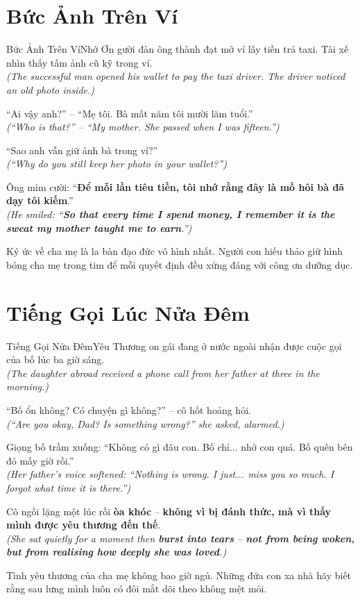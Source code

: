 \section{Bức Ảnh Trên Ví}
\begin{truyen}{Bức Ảnh Trên Ví}{Nhớ Ơn}
gười đàn ông thành đạt mở ví lấy tiền trả taxi. Tài xế nhìn thấy tấm ảnh cũ kỹ trong ví.\\
\textit{(The successful man opened his wallet to pay the taxi driver. The driver noticed an old photo inside.)}

``Ai vậy anh?'' – ``Mẹ tôi. Bà mất năm tôi mười lăm tuổi.''\\
\textit{(``Who is that?'' – ``My mother. She passed when I was fifteen.'')}

``Sao anh vẫn giữ ảnh bà trong ví?''\\
\textit{(``Why do you still keep her photo in your wallet?'')}

Ông mỉm cười: ``\textbf{Để mỗi lần tiêu tiền, tôi nhớ rằng đây là mồ hôi bà đã dạy tôi kiếm}.''\\
\textit{(He smiled: ``\textbf{So that every time I spend money, I remember it is the sweat my mother taught me to earn}.'')}
\end{truyen}
\begin{baihoc}
  Ký ức về cha mẹ là la bàn đạo đức vô hình nhất. Người con hiếu thảo giữ hình bóng cha mẹ trong tim để mỗi quyết định đều xứng đáng với công ơn dưỡng dục.
\end{baihoc}

\section{Tiếng Gọi Lúc Nửa Đêm}
\begin{truyen}{Tiếng Gọi Nửa Đêm}{Yêu Thương}
on gái đang ở nước ngoài nhận được cuộc gọi của bố lúc ba giờ sáng.\\
\textit{(The daughter abroad received a phone call from her father at three in the morning.)}

``Bố ổn không? Có chuyện gì không?'' – cô hốt hoảng hỏi.\\
\textit{(``Are you okay, Dad? Is something wrong?'' she asked, alarmed.)}

Giọng bố trầm xuống: ``Không có gì đâu con. Bố chỉ... nhớ con quá. Bố quên bên đó mấy giờ rồi.''\\
\textit{(Her father's voice softened: ``Nothing is wrong. I just... miss you so much. I forgot what time it is there.'')}

Cô ngồi lặng một lúc rồi \textbf{òa khóc} – \textbf{không vì bị đánh thức, mà vì thấy mình được yêu thương đến thế}.\\
\textit{(She sat quietly for a moment then \textbf{burst into tears} – \textbf{not from being woken, but from realising how deeply she was loved}.)}
\end{truyen}
\begin{baihoc}
  Tình yêu thương của cha mẹ không bao giờ ngủ. Những đứa con xa nhà hãy biết rằng sau lưng mình luôn có đôi mắt dõi theo không mệt mỏi.
\end{baihoc}

